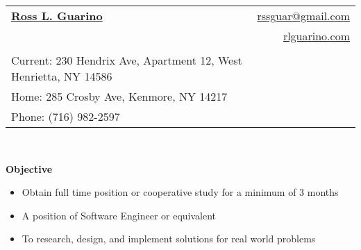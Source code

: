 \documentclass[letterpaper,11pt]{article}
\newcommand{\resheading}[1]{{\large \colorbox{mygrey}{\begin{minipage}{\textwidth}{\textbf{#1 \vphantom{p\^{E}}}}\end{minipage}}}}
\begin{document}
 

\thispagestyle{empty}
\pagestyle{empty}

\newcommand{\mywebheader}{
\begin{tabular*}{7in}{l@{\extracolsep{\fill}}r} \\
	\textbf{\href{http://www.rlguarino.com/}{\large Ross L. Guarino}} & \href{mailto:rlguarino@gmail.com}{rssguar@gmail.com}\\ &
	\href{http://rlguarino.com/}{rlguarino.com} \\ \vspace{-10mm} \\
	{\footnotesize {{Current: 230 Hendrix Ave, Apartment 12,
West Henrietta, NY 14586}}} & \\
	{\footnotesize {{Home: 285 Crosby Ave, Kenmore, NY 14217}}} & \\
	{\footnotesize {{Phone: (716) 982-2597}}} 	\end{tabular*}
\\
\vspace{0.1in}}

\mywebheader

\resheading{Objective}
{
	\begin{itemize}
	\setlength\itemsep{0em}
		\footnotesize
		\item{Obtain full time position or cooperative study for a minimum of 3 months}
		\item{A position of Software Engineer or equivalent}
		\item{To research, design, and implement solutions for real world problems}
	\end{itemize}
}

\end{document}
